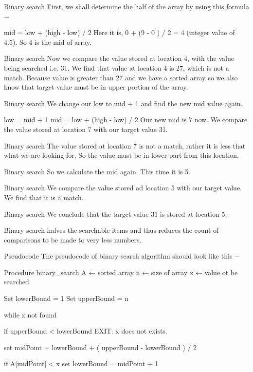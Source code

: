 \begin{frame}
\begin{frame}
Binary search
First, we shall determine the half of the array by using this formula −

mid = low + (high - low) / 2
Here it is, 0 + (9 - 0 ) / 2 = 4 (integer value of 4.5). So 4 is the mid of array.

Binary search
Now we compare the value stored at location 4, with the value being searched i.e. 31. We find that value at location 4 is 27, which is not a match. Because value is greater than 27 and we have a sorted array so we also know that target value must be in upper portion of the array.
\end{frame}
\begin{frame}
Binary search
We change our low to mid + 1 and find the new mid value again.

low = mid + 1
mid = low + (high - low) / 2
Our new mid is 7 now. We compare the value stored at location 7 with our target value 31.

Binary search
The value stored at location 7 is not a match, rather it is less that what we are looking for. So the value must be in lower part from this location.
\end{frame}
\begin{frame}
Binary search
So we calculate the mid again. This time it is 5.

Binary search
We compare the value stored ad location 5 with our target value. We find that it is a match.

Binary search
We conclude that the target value 31 is stored at location 5.

Binary search halves the searchable items and thus reduces the count of comparisons to be made to very less numbers.
\end{frame}
\begin{frame}
Pseudocode
The pseudocode of binary search algorithm should look like this −

Procedure binary_search
   A ← sorted array
   n ← size of array
   x ← value ot be searched

   Set lowerBound = 1
   Set upperBound = n 

   while x not found
   
      if upperBound < lowerBound 
         EXIT: x does not exists.
   
      set midPoint = lowerBound + ( upperBound - lowerBound ) / 2
      
      if A[midPoint] < x
         set lowerBound = midPoint + 1
         

\end{frame}
\end{frame}
